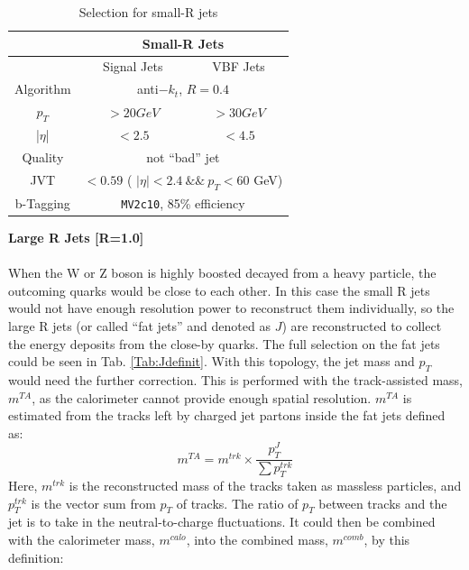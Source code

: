 \begin{table}[tbh]
	\caption{Selection for small-R jets}\label{tab:sjdefinit}
	\vspace{2.0em}
	\centering
	\begin{tabular}{|c||c|c|}
		\hline
		             & \multicolumn{2}{|c|}{ Small-R Jets }\\
		\hline
		             & Signal Jets & VBF Jets \\
		\hline
		Algorithm    & \multicolumn{2}{|c|}{ anti$-k_t$, $R=0.4$}\\
		\hline
		$p_T$        & $>20GeV$ & $>30GeV$\\
		\hline
		|$\eta$|     & $< 2.5$ & $<4.5$  \\
		\hline
		Quality      & \multicolumn{2}{|c|}{not ``bad'' jet}\\
		\hline
		JVT          & \multicolumn{2}{|c|}{$< 0.59$ ( $| \eta | < 2.4 ~ \& \& ~p_T < 60 $ GeV)} \\
		\hline
		b-Tagging    & \multicolumn{2}{|c|}{\texttt{MV2c10}, 85\% efficiency} \\
		\hline
	\end{tabular}
\end{table}
\noindent
{\bf Large R Jets [R=1.0]}
\\
\\When the W or Z boson is highly boosted decayed from a heavy particle, the outcoming quarks would be close to each other. In this case the small R jets would not have enough resolution power to reconstruct them individually, so the large R jets (or called ``fat jets'' and denoted as $J$) are reconstructed to collect the energy deposits from the close-by quarks. The full selection on the fat jets could be seen in Tab. \ref{Tab:Jdefinit}. With this topology, the jet mass and $p_{T}$ would need the further correction. This is performed with the track-assisted mass, $m^{TA}$, as the calorimeter cannot provide enough spatial resolution. $m^{TA}$ is estimated from the tracks left by charged jet partons inside the fat jets defined as:
\begin{equation}
m^{TA} = m^{trk} \times \frac{p_{T}^{J}}{\sum p_{T}^{trk}}
\end{equation}  
Here, $m^{trk}$ is the reconstructed mass of the tracks taken as massless particles, and $p_{T}^{trk}$ is the vector sum from $p_{T}$ of tracks.  The ratio of $p_{T}$ between tracks and the jet is to take in the neutral-to-charge fluctuations. It could then be combined with the calorimeter mass, $m^{calo}$, into the combined mass, $m^{comb}$, by this definition:
